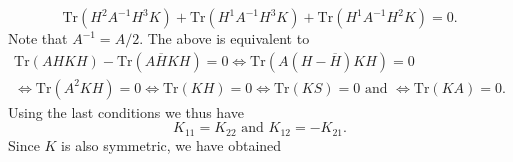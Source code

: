 \documentclass[12pt]{amsart}
\def\p{\partial}
\theoremstyle{definition}
\theoremstyle{remark}
\begin{document}
\[
 \text{Tr}(H^2A^{-1}H^3K)+\text{Tr}(H^1A^{-1}H^3K)+\text{Tr}(H^1A^{-1}H^2K)=0.
\]
Note that $A^{-1}=A/2$. The above is equivalent to
% 
\begin{multline}\label{eq:simplfied_identity_final}
\text{Tr}(AHKH)-\text{Tr}(A\overline HK H)=0 \Leftrightarrow  \text{Tr}(A(H-\overline H)KH)=0 \\
\Leftrightarrow  \text{Tr}(A^2KH)=0 \Leftrightarrow  \text{Tr}(KH)=0 
\Leftrightarrow  \text{Tr}(KS)=0 \text{ and } \Leftrightarrow  \text{Tr}(KA)=0.
\end{multline}
Using the last conditions we thus have
\[
 K_{11}=K_{22} \text{ and } K_{12}=-K_{21}.
\]
Since $K$ is also symmetric, we have obtained
\end{document}

